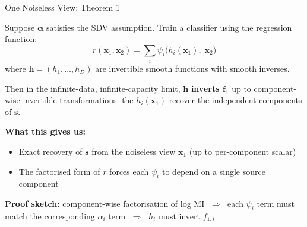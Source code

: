 \documentclass[aspectratio=169, 10pt]{beamer}
\begin{document}
\begin{frame}{One Noiseless View: Theorem 1}
  \begin{theorem}
    Suppose $\boldsymbol{\alpha}$ satisfies the SDV assumption. Train a classifier using the
    regression function:
    \[
      r(\mathbf{x}_1,\mathbf{x}_2) = \sum_i \psi_i\!\bigl(h_i(\mathbf{x}_1),\;\mathbf{x}_2\bigr)
    \]
    where $\mathbf{h}=(h_1,\ldots,h_D)$ are invertible smooth functions with smooth inverses.

    \medskip
    Then in the infinite-data, infinite-capacity limit, $\mathbf{h}$ \textbf{inverts $\mathbf{f}_1$} up to
    component-wise invertible transformations: the $h_i(\mathbf{x}_1)$ recover the independent
    components of $\mathbf{s}$.
  \end{theorem}

  \bigskip
  \textbf{What this gives us:}
  \begin{itemize}
    \item Exact recovery of $\mathbf{s}$ from the noiseless view $\mathbf{x}_1$ (up to per-component scalar)
    \item The factorised form of $r$ forces each $\psi_i$ to depend on a single source component
  \end{itemize}

  \medskip
  \textbf{Proof sketch:} component-wise factorisation of log MI $\;\Rightarrow\;$ each $\psi_i$ term must
  match the corresponding $\alpha_i$ term $\;\Rightarrow\;$ $h_i$ must invert $f_{1,i}$
\end{frame}
\end{document}

